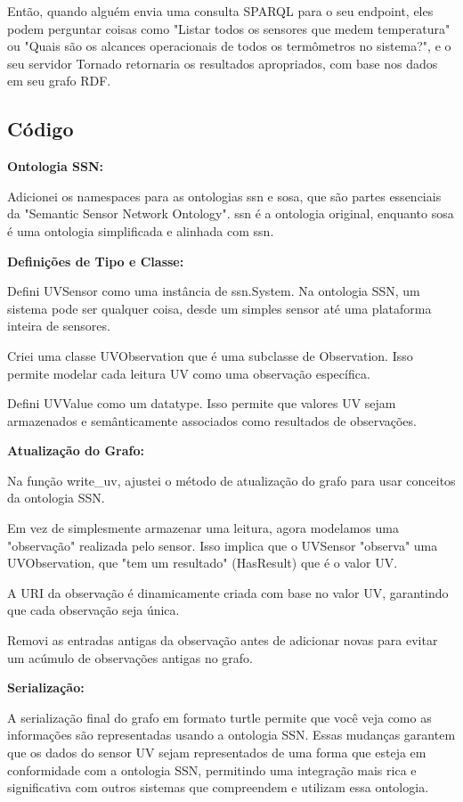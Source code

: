 Então, quando alguém envia uma consulta SPARQL para o seu endpoint, eles podem perguntar coisas como "Listar todos os sensores que medem temperatura" ou "Quais são os alcances operacionais de todos os termômetros no sistema?", e o seu servidor Tornado retornaria os resultados apropriados, com base nos dados em seu grafo RDF.

\subsection{Código}

\textbf{Ontologia SSN:}

Adicionei os namespaces para as ontologias ssn e sosa, que são partes essenciais da "Semantic Sensor Network Ontology". ssn é a ontologia original, enquanto sosa é uma ontologia simplificada e alinhada com ssn.

\textbf{Definições de Tipo e Classe:}

Defini UVSensor como uma instância de ssn.System. Na ontologia SSN, um sistema pode ser qualquer coisa, desde um simples sensor até uma plataforma inteira de sensores.

Criei uma classe UVObservation que é uma subclasse de Observation. Isso permite modelar cada leitura UV como uma observação específica.

Defini UVValue como um datatype. Isso permite que valores UV sejam armazenados e semânticamente associados como resultados de observações.

\textbf{Atualização do Grafo:}

Na função write\_uv, ajustei o método de atualização do grafo para usar conceitos da ontologia SSN.

Em vez de simplesmente armazenar uma leitura, agora modelamos uma "observação" realizada pelo sensor. Isso implica que o UVSensor "observa" uma UVObservation, que "tem um resultado" (HasResult) que é o valor UV.

A URI da observação é dinamicamente criada com base no valor UV, garantindo que cada observação seja única.

Removi as entradas antigas da observação antes de adicionar novas para evitar um acúmulo de observações antigas no grafo.

\textbf{Serialização:}

A serialização final do grafo em formato turtle permite que você veja como as informações são representadas usando a ontologia SSN.
Essas mudanças garantem que os dados do sensor UV sejam representados de uma forma que esteja em conformidade com a ontologia SSN, permitindo uma integração mais rica e significativa com outros sistemas que compreendem e utilizam essa ontologia.

